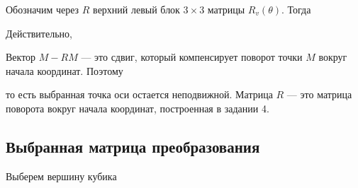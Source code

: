 \documentclass[a4paper,14pt]{extarticle}
\begin{document}
\begin{center}\end{center}

Обозначим через $R$ верхний левый блок $3 \times 3$ матрицы $R_v(\theta)$. Тогда

\begin{center}\end{center}

Действительно,

\begin{center}\end{center}

Вектор $M - RM$ — это сдвиг, который компенсирует поворот точки $M$ вокруг начала координат. Поэтому

\begin{center}\end{center}

то есть выбранная точка оси остается неподвижной. Матрица $R$ — это матрица поворота вокруг начала координат, построенная в задании 4.

\subsection*{Выбранная матрица преобразования}

Выберем вершину кубика

\begin{center}\end{center}
\end{document}
